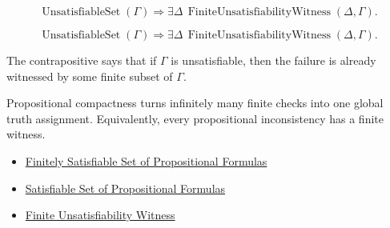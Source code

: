 \begin{remark*}
\[
\operatorname{UnsatisfiableSet}(\Gamma)
\Rightarrow
\exists\Delta\,\operatorname{FiniteUnsatisfiabilityWitness}(\Delta,\Gamma).
\]
\end{remark*}

\begin{remark*}
\[
\operatorname{UnsatisfiableSet}(\Gamma)
\Rightarrow
\exists\Delta\,\operatorname{FiniteUnsatisfiabilityWitness}(\Delta,\Gamma).
\]
\end{remark*}

\begin{remark*}
The contrapositive says that if \(\Gamma\) is unsatisfiable, then the failure is
already witnessed by some finite subset of \(\Gamma\).
\end{remark*}

\begin{remark*}[Interpretation]
Propositional compactness turns infinitely many finite checks into one global
truth assignment. Equivalently, every propositional inconsistency has a finite
witness.
\end{remark*}

\begin{dependencies}
\begin{itemize}
  \item \hyperref[def:finitely-satisfiable-set-of-propositional-formulas]{Finitely Satisfiable Set of Propositional Formulas}
  \item \hyperref[def:satisfiable-set-of-propositional-formulas]{Satisfiable Set of Propositional Formulas}
  \item \hyperref[def:finite-unsatisfiability-witness-propositional-logic]{Finite Unsatisfiability Witness}
\end{itemize}
\end{dependencies}
